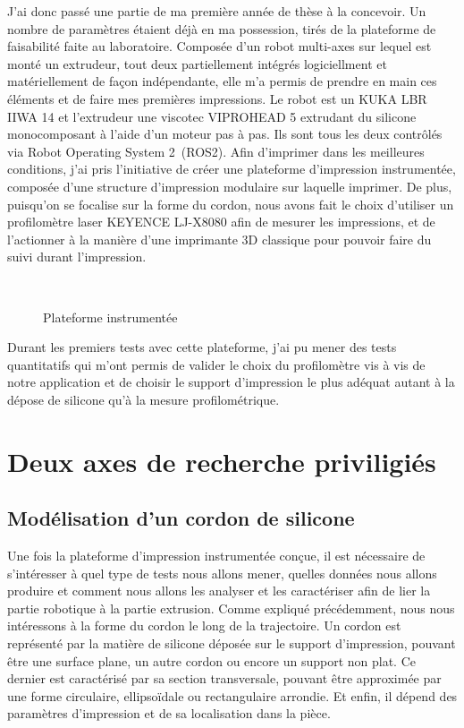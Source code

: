 \documentclass[11pt,a4paper]{article}
\begin{document}
        J'ai donc passé une partie de ma première année de thèse à la concevoir. Un nombre de paramètres étaient déjà en ma possession, tirés de la plateforme de faisabilité faite au laboratoire. Composée d'un robot multi-axes sur lequel est monté un extrudeur, tout deux partiellement intégrés logiciellment et matériellement de façon indépendante, elle m'a permis de prendre en main ces éléments et de faire mes premières impressions. Le robot est un KUKA LBR IIWA 14 et l'extrudeur une viscotec VIPROHEAD 5 extrudant du silicone monocomposant à l'aide d'un moteur pas à pas. Ils sont tous les deux contrôlés via Robot Operating System 2~(ROS2). Afin d'imprimer dans les meilleures conditions, j'ai pris l'initiative de créer une plateforme d'impression instrumentée, composée d'une structure d'impression modulaire sur laquelle imprimer. De plus, puisqu'on se focalise sur la forme du cordon, nous avons fait le choix d'utiliser un profilomètre laser KEYENCE LJ-X8080 afin de mesurer les impressions, et de l'actionner à la manière d'une imprimante 3D classique pour pouvoir faire du suivi durant l'impression. 

        
        \begin{figure}[H]
            \centering
            \def\svgwidth{0.8\columnwidth}
            \caption{Plateforme instrumentée}~\label{fig:laser_structure}
        \end{figure}
        

        Durant les premiers tests avec cette plateforme, j'ai pu mener des tests quantitatifs qui m'ont permis de valider le choix du profilomètre vis à vis de notre application et de choisir le support d'impression le plus adéquat autant à la dépose de silicone qu'à la mesure profilométrique. 


\section*{Deux axes de recherche priviligiés}

    \subsection{Modélisation d'un cordon de silicone}
        Une fois la plateforme d'impression instrumentée conçue, il est nécessaire de s'intéresser à quel type de tests nous allons mener, quelles données nous allons produire et comment nous allons les analyser et les caractériser afin de lier la partie robotique à la partie extrusion. 
        Comme expliqué précédemment, nous nous intéressons à la forme du cordon le long de la trajectoire. 
        Un cordon est représenté par la matière de silicone déposée sur le support d'impression, pouvant être une surface plane, un autre cordon ou encore un support non plat. Ce dernier est caractérisé par sa section transversale, pouvant être approximée par une forme circulaire, ellipsoïdale ou rectangulaire arrondie. Et enfin, il dépend des paramètres d'impression et de sa localisation dans la pièce. 
\end{document}
